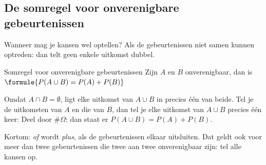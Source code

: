 \begin{oefeningen}
\end{oefeningen}

\subsection{De somregel voor onverenigbare gebeurtenissen}

Wanneer mag je kansen wel optellen? Als de gebeurtenissen niet samen kunnen optreden: dan telt geen enkele uitkomst dubbel.

\begin{theorie}
\begin{stelling}{Somregel voor onverenigbare gebeurtenissen}
Zijn $A$ en $B$ onverenigbaar, dan is \quad $\formule{P(A \cup B) = P(A) + P(B)}$
\end{stelling}

\begin{bewijs}
Omdat $A \cap B = \emptyset$, ligt elke uitkomst van $A \cup B$ in precies één van beide. Tel je de uitkomsten van $A$ en die van $B$, dan tel je elke uitkomst van $A \cup B$ precies één keer:
Deel door $\#\Omega$: dan staat er $P(A \cup B) = P(A) + P(B)$.
\end{bewijs}
\end{theorie}

Kortom: \textit{of} wordt \textit{plus}, als de gebeurtenissen elkaar uitsluiten. Dat geldt ook voor meer dan twee gebeurtenissen die twee aan twee onverenigbaar zijn: tel alle kansen op.


\begin{oefeningen}
\end{oefeningen}

